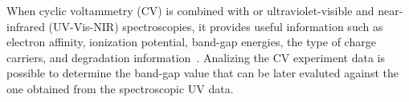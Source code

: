 \documentclass[../Master.tex]{subfiles}
\begin{document}
When cyclic voltammetry (CV) is combined with or ultraviolet-visible and near-infrared (UV-Vis-NIR) spectroscopies, it provides useful information such as electron affinity, ionization potential, band-gap energies, the type of charge carriers, and degradation information\ \cite{pluczyk_using_2018}. Analizing the CV experiment data is possible to determine the band-gap value that can be later evaluted against the one obtained from the spectroscopic UV data.
\end{document}

